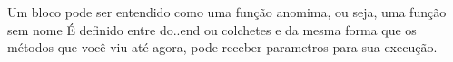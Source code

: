 Um bloco pode ser entendido como uma função anomima, ou seja, uma função sem nome
É definido entre do..end ou colchetes e da mesma forma que os métodos que você viu até agora, pode receber parametros para sua execução.
